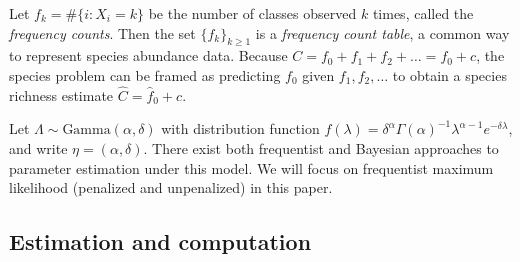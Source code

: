 \documentclass[12pt]{article}
\begin{document}
Let $f_k = \#\{i: X_i = k\}$ be the number of classes observed $k$ times, called the \textit{frequency counts}.  Then the set $\{f_k\}_{k \geq 1}$ is a \textit{frequency count table}, a common way to represent species abundance data. Because $C = f_0 + f_1 + f_2 + \dots = f_0 + c$, the species problem can be framed as predicting $f_0$ given $f_1, f_2, \ldots$ to obtain a species richness estimate $\hat{C} = \hat{f}_0 + c$.

Let $\Lambda \sim \text{Gamma}(\alpha, \delta)$ with distribution function $f(\lambda) = \delta^\alpha \Gamma (\alpha)^{-1} \lambda^{\alpha - 1} e^{-\delta \lambda}$, and write $\eta = (\alpha, \delta)$.
%
There exist both frequentist \citep{fisher_1943,chao_2002} and Bayesian \citep{efron_1976,barger_2010} approaches to parameter estimation under this model. We will focus on frequentist maximum likelihood (penalized and unpenalized) in this paper.

\subsection{Estimation and computation}
\end{document}
